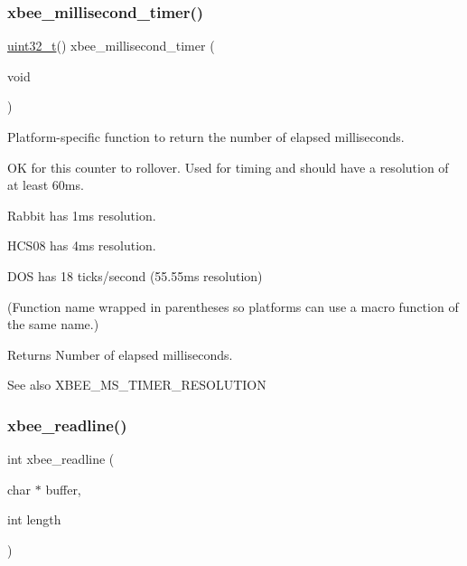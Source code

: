 \subsubsection{\texorpdfstring{xbee\+\_\+millisecond\+\_\+timer()}{xbee\_millisecond\_timer()}}
{\footnotesize\ttfamily \hyperlink{group__hal__dos_ga09a1e304d66d35dd47daffee9731edaa}{uint32\+\_\+t}() xbee\+\_\+millisecond\+\_\+timer (\begin{DoxyParamCaption}\item[{void}]{ }\end{DoxyParamCaption})}



Platform-\/specific function to return the number of elapsed milliseconds. 

OK for this counter to rollover. Used for timing and should have a resolution of at least 60ms.


\begin{DoxyItemize}
\item Rabbit has 1ms resolution.
\item H\+C\+S08 has 4ms resolution.
\item D\+OS has 18 ticks/second (55.\+55ms resolution)
\end{DoxyItemize}

(Function name wrapped in parentheses so platforms can use a macro function of the same name.)

\begin{DoxyReturn}{Returns}
Number of elapsed milliseconds.
\end{DoxyReturn}
\begin{DoxySeeAlso}{See also}
X\+B\+E\+E\+\_\+\+M\+S\+\_\+\+T\+I\+M\+E\+R\+\_\+\+R\+E\+S\+O\+L\+U\+T\+I\+ON 
\end{DoxySeeAlso}
\mbox{\label{group__hal_ga8c0c80b64f63d395e718172190b21fcc}} 
\subsubsection{\texorpdfstring{xbee\+\_\+readline()}{xbee\_readline()}}
{\footnotesize\ttfamily int xbee\+\_\+readline (\begin{DoxyParamCaption}\item[{char $\ast$}]{buffer,  }\item[{int}]{length }\end{DoxyParamCaption})}



